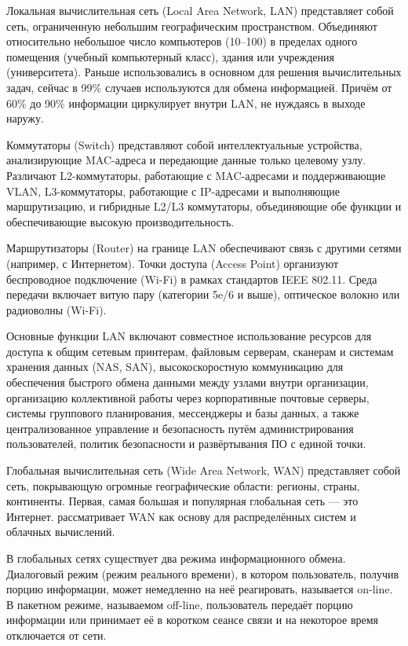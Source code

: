 \documentclass{SibFU-docs}
\begin{document}
Локальная вычислительная сеть (Local Area Network, LAN) представляет собой сеть, ограниченную небольшим географическим пространством. Объединяют относительно небольшое число компьютеров (10--100) в пределах одного помещения (учебный компьютерный класс), здания или учреждения (университета). Раньше использовались в основном для решения вычислительных задач, сейчас в 99\% случаев используются для обмена информацией. Причём от 60\% до 90\% информации циркулирует внутри LAN, не нуждаясь в выходе наружу.


Коммутаторы (Switch) представляют собой интеллектуальные устройства, анализирующие MAC-адреса и передающие данные только целевому узлу. Различают L2-коммутаторы, работающие с MAC-адресами и поддерживающие VLAN, L3-коммутаторы, работающие с IP-адресами и выполняющие маршрутизацию, и гибридные L2/L3 коммутаторы, объединяющие обе функции и обеспечивающие высокую производительность.

Маршрутизаторы (Router) на границе LAN обеспечивают связь с другими сетями (например, с Интернетом). Точки доступа (Access Point) организуют беспроводное подключение (Wi-Fi) в рамках стандартов IEEE 802.11. Среда передачи включает витую пару (категории 5e/6 и выше), оптическое волокно или радиоволны (Wi-Fi).


Основные функции LAN включают совместное использование ресурсов для доступа к общим сетевым принтерам, файловым серверам, сканерам и системам хранения данных (NAS, SAN), высокоскоростную коммуникацию для обеспечения быстрого обмена данными между узлами внутри организации, организацию коллективной работы через корпоративные почтовые серверы, системы группового планирования, мессенджеры и базы данных, а также централизованное управление и безопасность путём администрирования пользователей, политик безопасности и развёртывания ПО с единой точки.


Глобальная вычислительная сеть (Wide Area Network, WAN) представляет собой сеть, покрывающую огромные географические области: регионы, страны, континенты. Первая, самая большая и популярная глобальная сеть --- это Интернет. \cite{kleppmann2017designing} рассматривает WAN как основу для распределённых систем и облачных вычислений.

В глобальных сетях существует два режима информационного обмена. Диалоговый режим (режим реального времени), в котором пользователь, получив порцию информации, может немедленно на неё реагировать, называется on-line. В пакетном режиме, называемом off-line, пользователь передаёт порцию информации или принимает её в коротком сеансе связи и на некоторое время отключается от сети.
\end{document}
